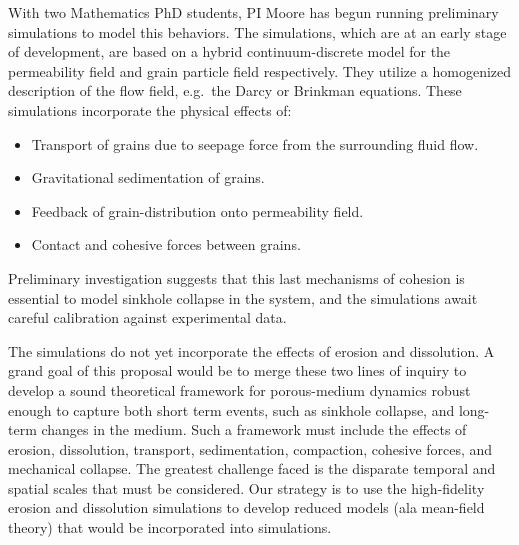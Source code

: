 \documentclass[12pt]{article}
\begin{document}

	With two Mathematics PhD students, PI Moore has begun running preliminary simulations to model this behaviors. The simulations, which are at an early stage of development, are based on a hybrid continuum-discrete model for the permeability field and grain particle field respectively. They utilize a homogenized description of the flow field, e.g.~the Darcy or Brinkman equations.
These simulations incorporate the physical effects of:
\begin{itemize}
\item Transport of grains due to seepage force from the surrounding fluid flow.
\item Gravitational sedimentation of grains.
\item Feedback of grain-distribution onto permeability field.
\item Contact and cohesive forces between grains.
\end{itemize}
Preliminary investigation suggests that this last mechanisms of cohesion is essential to model sinkhole collapse in the system, and the simulations await careful calibration against experimental data.

The simulations do not yet incorporate the effects of erosion and dissolution. A grand goal of this proposal would be to merge these two lines of inquiry to develop a sound theoretical framework for porous-medium dynamics robust enough to capture both short term events, such as sinkhole collapse, and long-term changes in the medium. Such a framework must include the effects of erosion, dissolution, transport, sedimentation, compaction, cohesive forces, and mechanical collapse. The greatest challenge faced is the disparate temporal and spatial scales that must be considered. Our strategy is to use the high-fidelity erosion and dissolution simulations to develop reduced models (ala mean-field theory) that would be incorporated into simulations.



\end{document}
